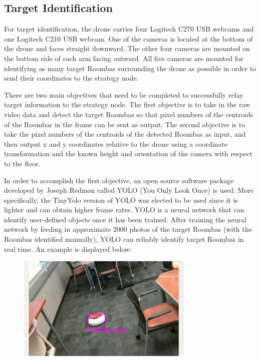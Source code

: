 \documentclass[12pt,letterpaper]{article}
\begin{document}
		\subsection*{Target Identification}
			For target identification, the drone carries four Logitech C270 USB webcams and one Logitech C210 USB webcam. One of the cameras is located at the bottom of the drone and faces straight downward. The other four cameras are mounted on the bottom side of each arm facing outward. All five cameras are mounted for identifying as many target Roombas surrounding the drone as possible in order to send their coordinates to the strategy node.

			There are two main objectives that need to be completed to successfully relay target information to the strategy node. The first objective is to take in the raw video data and detect the target Roombas so that pixel numbers of the centroids of the Roombas in the frame can be sent as output. The second objective is to take the pixel numbers of the centroids of the detected Roombas as input, and then output x and y coordinates relative to the drone using a coordinate transformation and the known height and orientation of the camera with respect to the floor.

			In order to accomplish the first objective, an open source software package developed by Joseph Redmon called YOLO (You Only Look Once) is used. More specifically, the TinyYolo version of YOLO was elected to be used since it is lighter and can obtain higher frame rates. YOLO is a neural network that can identify user-defined objects once it has been trained. After training the neural network by feeding in approximate 2000 photos of the target Roombas (with the Roombas identified manually), YOLO can reliably identify target Roombas in real time. An example is displayed below:

			\begin{figure}[!htbp]
				\begin{center}
					\includegraphics[width=0.75\textwidth]{roomba}
				\end{center}
			\end{figure}
\end{document}
